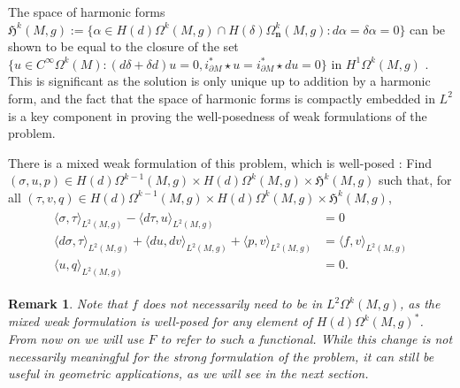 \documentclass[11pt]{article}
\newtheorem{remark}[theorem]{Remark}
\newcommand{\iprod}[1]{\langle #1 \rangle}
\begin{document}
The space of harmonic forms $\mathfrak{H}^k(M,g) := \{\alpha \in H(d)\Omega^k(M,g) \cap H(\delta)\Omega^k_\mathbf{n}(M,g) : d\alpha = \delta \alpha = 0\}$ can be shown to be equal to the closure of the set $\{u \in C^\infty\Omega^k(M) : (d\delta + \delta d)u = 0, i_{\partial M}^*\star u = i_{\partial M}^* \star du = 0\}$ in $H^1\Omega^k(M,g)$ \cite{Schwarz}. This is significant as the solution is only unique up to addition by a harmonic form, and the fact that the space of harmonic forms is compactly embedded in $L^2$ is a key component in proving the well-posedness of weak formulations of the problem.

There is a mixed weak formulation of this problem, which is well-posed \cite{Arnold,Arnold-Winther}: Find $(\sigma,u,p) \in H(d)\Omega^{k-1}(M,g) \times H(d)\Omega^k(M,g) \times \mathfrak{H}^k(M,g)$ such that, for all $(\tau,v,q) \in H(d)\Omega^{k-1}(M,g) \times H(d)\Omega^k(M,g) \times \mathfrak{H}^k(M,g)$,
\begin{align}\label{contproblem}
\begin{split}\iprod{\sigma,\tau}_{L^2(M,g)} - \iprod{d\tau,u}_{L^2(M,g)} &= 0\\
\iprod{d\sigma,\tau}_{L^2(M,g)} + \iprod{du,dv}_{L^2(M,g)} + \iprod{p,v}_{L^2(M,g)} &= \iprod{f,v}_{L^2(M,g)}\\
\iprod{u,q}_{L^2(M,g)} &= 0.
\end{split}\end{align}

\begin{remark}\label{dualnorm}Note that $f$ does not necessarily need to be in $L^2\Omega^k(M,g)$, as the mixed weak formulation is well-posed for any element of $H(d)\Omega^k(M,g)^*$. From now on we will use $F$ to refer to such a functional. While this change is not necessarily meaningful for the strong formulation of the problem, it can still be useful in geometric applications, as we will see in the next section. \end{remark}
\end{document}
